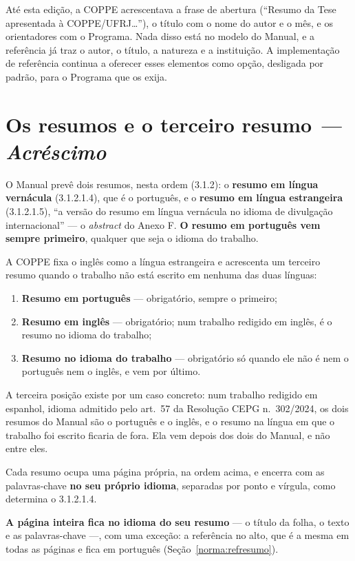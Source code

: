 \documentclass[a4paper,11pt]{article}
\newcommand\tipo[1]{\normalfont\textit{--- #1}}
\begin{document}
Até esta edição, a COPPE acrescentava a frase de abertura (``Resumo da Tese
apresentada à COPPE/UFRJ\ldots''), o título com o nome do autor e o mês, e os
orientadores com o Programa. Nada disso está no modelo do Manual, e a
referência já traz o autor, o título, a natureza e a instituição. A
implementação de referência continua a oferecer esses elementos como opção,
desligada por padrão, para o Programa que os exija.

\section{Os resumos e o terceiro resumo \tipo{Acréscimo}}

O Manual prevê dois resumos, nesta ordem (3.1.2): o \textbf{resumo em língua
vernácula} (3.1.2.1.4), que é o português, e o \textbf{resumo em língua
estrangeira} (3.1.2.1.5), ``a versão do resumo em língua vernácula no idioma de
divulgação internacional'' --- o \textit{abstract} do Anexo F. \textbf{O resumo
em português vem sempre primeiro}, qualquer que seja o idioma do trabalho.

A COPPE fixa o inglês como a língua estrangeira e acrescenta um terceiro resumo
quando o trabalho não está escrito em nenhuma das duas línguas:

\begin{enumerate}[nosep]
  \item \textbf{Resumo em português} --- obrigatório, sempre o primeiro;
  \item \textbf{Resumo em inglês} --- obrigatório; num trabalho redigido em
    inglês, é o resumo no idioma do trabalho;
  \item \textbf{Resumo no idioma do trabalho} --- obrigatório só quando ele não
    é nem o português nem o inglês, e vem por último.
\end{enumerate}

A terceira posição existe por um caso concreto: num trabalho redigido em
espanhol, idioma admitido pelo art.\ 57 da Resolução CEPG n.\ 302/2024, os dois
resumos do Manual são o português e o inglês, e o resumo na língua em que o
trabalho foi escrito ficaria de fora. Ela vem depois dos dois do Manual, e não
entre eles.

Cada resumo ocupa uma página própria, na ordem acima, e encerra com as
palavras-chave \textbf{no seu próprio idioma}, separadas por ponto e vírgula,
como determina o 3.1.2.1.4.

\textbf{A página inteira fica no idioma do seu resumo} --- o título da folha, o
texto e as palavras-chave ---, com uma exceção: a referência no alto, que é a
mesma em todas as páginas e fica em português
(Seção~\ref{norma:refresumo}).
\end{document}
